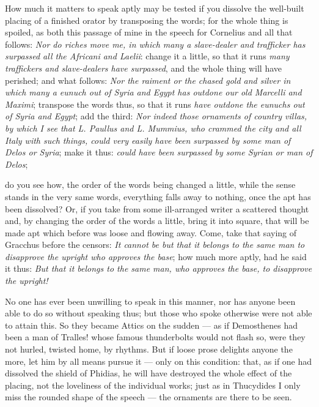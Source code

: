  How much it matters to speak aptly may be tested if you dissolve the well-built placing of a finished orator by transposing the words; for the whole thing is spoiled, as both this passage of mine in the speech for Cornelius and all that follows: \textit{Nor do riches move me, in which many a slave-dealer and trafficker has surpassed all the Africani and Laelii}: change it a little, so that it runs \textit{many traffickers and slave-dealers have surpassed}, and the whole thing will have perished; and what follows: \textit{Nor the raiment or the chased gold and silver in which many a eunuch out of Syria and Egypt has outdone our old Marcelli and Maximi}; transpose the words thus, so that it runs \textit{have outdone the eunuchs out of Syria and Egypt}; add the third: \textit{Nor indeed those ornaments of country villas, by which I see that L. Paullus and L. Mummius, who crammed the city and all Italy with such things, could very easily have been surpassed by some man of Delos or Syria}; make it thus: \textit{could have been surpassed by some Syrian or man of Delos};

 do you see how, the order of the words being changed a little, while the sense stands in the very same words, everything falls away to nothing, once the apt has been dissolved? Or, if you take from some ill-arranged writer a scattered thought and, by changing the order of the words a little, bring it into square, that will be made apt which before was loose and flowing away. Come, take that saying of Gracchus before the censors: \textit{It cannot be but that it belongs to the same man to disapprove the upright who approves the base}; how much more aptly, had he said it thus: \textit{But that it belongs to the same man, who approves the base, to disapprove the upright!}

 No one has ever been unwilling to speak in this manner, nor has anyone been able to do so without speaking thus; but those who spoke otherwise were not able to attain this. So they became Attics on the sudden — as if Demosthenes had been a man of Tralles! whose famous thunderbolts would not flash so, were they not hurled, twisted home, by rhythms. But if loose prose delights anyone the more, let him by all means pursue it — only on this condition: that, as if one had dissolved the shield of Phidias, he will have destroyed the whole effect of the placing, not the loveliness of the individual works; just as in Thucydides I only miss the rounded shape of the speech — the ornaments are there to be seen.

